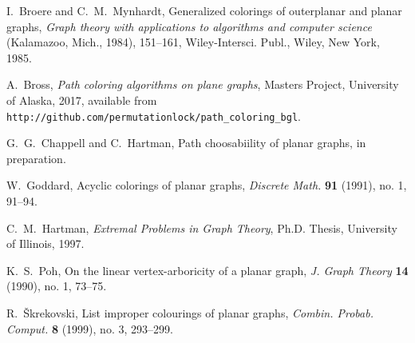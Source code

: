 \documentclass[12pt,letterpaper]{article}
\theoremstyle{plain}
\theoremstyle{definition}
\begin{document}
\begin{thebibliography}{99}

I.~Broere and C.~M.~Mynhardt,
Generalized colorings of outerplanar and planar graphs,
\textit{Graph theory with applications to algorithms and computer science}
 (Kalamazoo, Mich., 1984),
151--161,
Wiley-Intersci. Publ., Wiley, New York, 1985.

A.~Bross,
\textit{Path coloring algorithms on plane graphs},
Masters Project,
University of Alaska,
2017,
available from\hfil\break
\texttt{http://github.com/permutationlock/path\_coloring\_bgl}.

G.~G.~Chappell and C.~Hartman,
Path choosabiility of planar graphs,
in preparation.

W.~Goddard,
Acyclic colorings of planar graphs,
\textit{Discrete Math.}
\textbf{91} (1991), no. 1,
91--94.

C.~M.~Hartman,
\textit{Extremal Problems in Graph Theory},
Ph.D. Thesis,
University of Illinois,
1997.

K.~S.~Poh,
On the linear vertex-arboricity of a planar graph,
\textit{J. Graph Theory}
\textbf{14} (1990), no. 1,
73--75.

R.~\v{S}krekovski,
List improper colourings of planar graphs,
\textit{Combin. Probab. Comput.}
\textbf{8} (1999), no. 3,
293--299.

\end{thebibliography}
\end{document}
